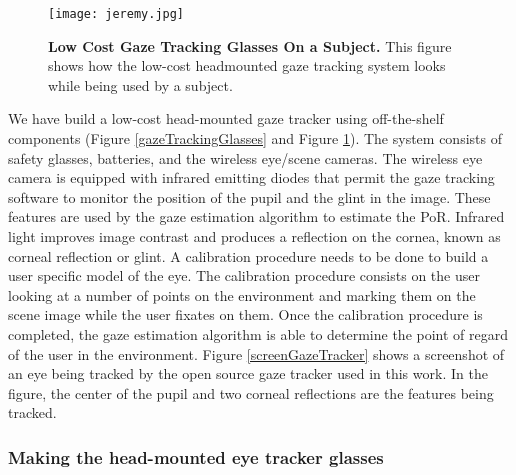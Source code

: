 \documentclass[jou,a4paper,notxfonts]{apa}
\begin{document}
\begin{figure}[tp]
 \texttt{[image: jeremy.jpg]}
 \caption{\textbf{Low Cost Gaze Tracking Glasses On a Subject.} This figure shows how the low-cost headmounted gaze
 tracking system looks while being used by a subject.}
 \label{jeremy}
\end{figure}

We have build a low-cost head-mounted gaze tracker using off-the-shelf components (Figure \ref{gazeTrackingGlasses} and Figure \ref{jeremy}). The system consists of
safety glasses, batteries, and the wireless eye/scene cameras. The wireless eye camera
is equipped with infrared emitting diodes that permit the gaze tracking software to monitor the position of the pupil and the glint in the image. These features are used by the gaze estimation algorithm to estimate the PoR. Infrared light improves image contrast and produces a reflection on
the cornea, known as corneal reflection or glint. A calibration procedure needs to be done to build a user specific model of the eye. The calibration procedure consists on the user looking at a number of points on the environment and marking them on the scene image while the user fixates on them. Once the calibration procedure is completed, the gaze estimation algorithm is able to determine the point of regard of the user in the environment. Figure \ref{screenGazeTracker} shows a screenshot of an eye being tracked by the open source gaze tracker  \cite{mardanbegi2012eye} used in this work. In the figure, the center of the pupil and two corneal reflections are the features being tracked.

\subsubsection{Making the head-mounted eye tracker glasses}\hspace{0pt} \\
\end{document}
